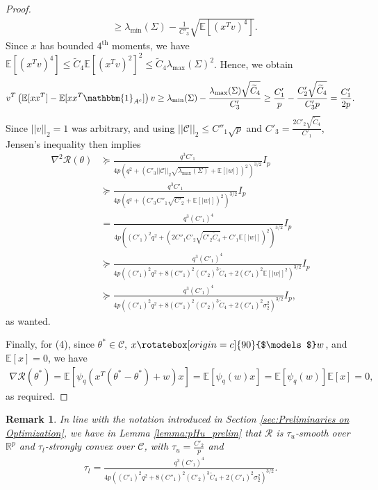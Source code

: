\documentclass{article}
\newtheorem{remark}{\textbf{Remark}}
\newcommand{\indep}{\rotatebox[origin=c]{90}{$\models$}}
\begin{document}
\begin{proof}
\begin{align*}
&\geq \lambda_{\min}(\Sigma) - \frac{1}{C'_3}\sqrt{\mathbb{E}\left[(x^Tv)^4\right]}.
\end{align*}
Since $x$ has bounded $4^{\text{th}}$ moments, we have $\mathbb{E}\left[(x^Tv)^4\right] \leq \widetilde{C}_4\mathbb{E}\left[(x^Tv)^2\right]^2\leq \widetilde{C}_4\lambda_{\max}(\Sigma)^2$. Hence, we obtain
\begin{align*}
v^T\left(\mathbb{E}[xx^T] - \mathbb{E}[xx^T\mathbbm{1}_{A^c}]\right)v \geq \lambda_{\min}(\Sigma) - \frac{\lambda_{\max}(\Sigma)\sqrt{\widetilde{C}_4}}{C'_3} \geq \frac{C'_1}{p} - \frac{C'_2\sqrt{\widetilde{C}_4}}{C'_3p} = \frac{C'_1}{2p}. 
\end{align*}
Since $||v||_2 = 1$ was arbitrary, and using $||\mathcal{C}||_2 \leq C''_1\sqrt{p}$ and $C'_3 = \frac{2C'_2\sqrt{\widetilde{C}_4}}{C'_1}$, Jensen's inequality then implies
\begin{align*}
\nabla^2\mathcal{R}(\theta) &\succeq \frac{q^3C'_1}{4p\left(q^2 + \left(C'_3||\mathcal{C}||_2\sqrt{\lambda_{\max}(\Sigma)} + \mathbb{E}[|w|]\right)^2\right)^{3/2}}I_p \\
%
& \succeq \frac{q^3C'_1}{4p\left(q^2 + \left(C'_3C''_1\sqrt{C'_2} + \mathbb{E}[|w|]\right)^2\right)^{3/2}}I_p\\
&= \frac{q^3(C'_1)^4}{4p\left((C'_1)^2q^2 + \left(2C''_1C'_2\sqrt{C'_2\widetilde{C}_4} + C'_1\mathbb{E}[|w|]\right)^2\right)^{3/2}}I_p\\
&\succeq \frac{q^3(C'_1)^4}{4p\left((C'_1)^2q^2 + 8(C''_1)^2(C'_2)^3\widetilde{C}_4 + 2(C'_1)^2\mathbb{E}[|w|]^2\right)^{3/2}}I_p\\
&\succeq \frac{q^3(C'_1)^4}{4p\left((C'_1)^2q^2 + 8(C''_1)^2(C'_2)^3\widetilde{C}_4 + 2(C'_1)^2\sigma_2^2\right)^{3/2}}I_p,
\end{align*}
as wanted.

Finally, for (4), since $\theta^* \in \mathcal{C}$, $x \indep w$, and $\mathbb{E}[x] = 0$, we have 
\begin{align*}
\nabla \mathcal{R}(\theta^*) = \mathbb{E}\left[\psi_q(x^T(\theta^* - \theta^*) + w)x\right] = \mathbb{E}[\psi_q(w)x] = \mathbb{E}[\psi_q(w)]\mathbb{E}[x] = 0,
\end{align*}
as required.
\end{proof}

\begin{remark}
\label{remark:pHu_prelim_rmk}
In line with the notation introduced in Section \ref{sec:Preliminaries on Optimization}, we have in Lemma \ref{lemma:pHu_prelim} that $\mathcal{R}$ is $\tau_u$-smooth over $\mathbb{R}^p$ and $\tau_l$-strongly convex over $\mathcal{C}$, with $\tau_u = \frac{C'_2}{p}$ and 
\begin{align*}
\tau_l = \frac{q^3(C'_1)^4}{4p\left((C'_1)^2q^2 + 8(C''_1)^2(C'_2)^3\widetilde{C}_4 + 2(C'_1)^2\sigma_2^2\right)^{3/2}}.
\end{align*}
\end{remark}
\end{document}
